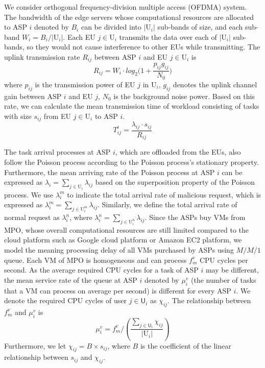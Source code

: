 \documentclass[10pt,journal, compsoc]{IEEEtran}
\begin{document}
We consider orthogonal frequency-division multiple access (OFDMA) system. The bandwidth of the edge servers whose computational resources are allocated to ASP $i$ denoted by $B_i$ can be divided into $|\mathrm{U}_i|$ sub-bands of size, and each sub-band $W_{i} = B_i/|\mathrm{U}_i|$. Each EU $j\in \mathrm{U}_i$ transmits the data over each of $|\mathrm{U}_i|$ sub-bands, so they would not cause interference to other EUs while transmitting. The uplink transmission rate $R_{ij}$ between ASP $i$ and EU $j \in \mathrm{U}_i$ is
\begin{equation} \label{eqn:shannon}
R_{ij}=W_i \cdot log_2\Big(1+\frac{p_{ij}g_{ij}}{N_{0}}\Big)
\end{equation}
where $p_{ij}$ is the transmission power of EU $j$ in $\mathrm{U}_i$, $g_{ij}$ denotes the uplink channel gain between ASP $i$ and EU $j$, $N_0$ is the background noise power. Based on this rate, we can calculate the mean transmission time of workload consisting of tasks with size $s_{ij}$ from EU $j \in \mathrm{U}_i$ to ASP $i$.
\begin{equation}
T_{ij}^t=\frac{\lambda_{ij} \cdot s_{ij}}{R_{ij}}
\end{equation}

The task arrival processes at ASP $i$, which are offloaded from the EUs, also follow the Poisson process according to the Poisson process's stationary property. Furthermore, the mean arriving rate of the Poisson process at ASP $i$ can be expressed as $\lambda_i = \sum_{j \in \mathrm{U}_i} \lambda_{ij}$ based on the superposition property of the Poisson process. We use $\lambda_i^m$ to indicate the total arrival rate of malicious request, which is expressed as $\lambda_i^m = \sum_{j \in \mathrm{U}_i^m} \lambda_{ij}$. Similarly, we define the total arrival rate of normal request as $\lambda_i^n$, where $\lambda_i^n =  \sum_{j \in \mathrm{U}_i^n} \lambda_{ij}$. Since the ASPs buy VMs from MPO, whose overall computational resources are still limited compared to the cloud platform such as Google cloud platform or Amazon EC2 platform, we model the meaning processing delay of all VMs purchased by ASPs using $M/M/1$ queue. Each VM of MPO is homogeneous and can process $f_m^v$ CPU cycles per second. As the average required CPU cycles for a task of ASP $i$ may be different, the mean service rate of the queue at ASP $i$ denoted by $\mu_i^v$ (the number of tasks that a VM can process on average per second) is different for every ASP $i$. We denote the required CPU cycles of user $j \in \mathsf{U}_i$ as $\chi_{ij}$. The relationship between $f_m^v$ and $\mu_i^v$ is
\begin{equation}\label{eqn:service_rate}
\mu_i^v = f_m^v/(\frac{\sum_{j \in \mathsf{U}_i} \chi_{ij}}{|\mathrm{U}_i|})
\end{equation}
Furthermore, we let $\chi_{ij} = B \times s_{ij}$, where $B$ is the coefficient of the linear relationship between $s_{ij}$ and $\chi_{ij}$.
\end{document}
